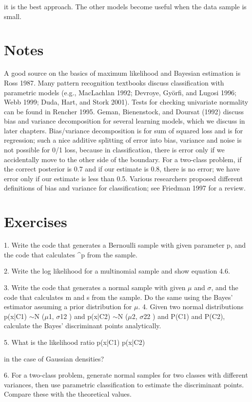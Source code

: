 it is the best approach. The other models become useful when the data sample is small.

\section{Notes}

A good source on the basics of maximum likelihood and Bayesian estimation is Ross 1987. Many pattern recognition textbooks discuss classification with parametric models (e.g., MacLachlan 1992; Devroye, Györfi, and Lugosi 1996; Webb 1999; Duda, Hart, and Stork 2001). Tests for checking univariate normality can be found in Rencher 1995. Geman, Bienenstock, and Doursat (1992) discuss bias and variance decomposition for several learning models, which we discuss in later chapters. Bias/variance decomposition is for sum of squared loss and is for regression; such a nice additive splitting of error into bias, variance and noise is not possible for 0/1 loss, because in classification, there is error only if we accidentally move to the other side of the boundary. For a two-class problem, if the correct posterior is 0.7 and if our estimate is 0.8, there is no error; we have error only if our estimate is less than 0.5. Various researchers proposed different definitions of bias and variance for classification; see Friedman 1997 for a review.

\section{Exercises}

1. Write the code that generates a Bernoulli sample with given parameter p, and the code that calculates \textasciicircum{}p from the sample.

2. Write the log likelihood for a multinomial sample and show equation 4.6.

3. Write the code that generates a normal sample with given $\mu$ and $\sigma$, and the code that calculates m and s from the sample. Do the same using the Bayes’ estimator assuming a prior distribution for $\mu$. 4. Given two normal distributions p(x|C1) $\sim$N ($\mu$1, $\sigma$12 ) and p(x|C2) $\sim$N ($\mu$2, $\sigma$22 ) and P(C1) and P(C2), calculate the Bayes’ discriminant points analytically.

5. What is the likelihood ratio p(x|C1) p(x|C2)

in the case of Gaussian densities?

6. For a two-class problem, generate normal samples for two classes with different variances, then use parametric classification to estimate the discriminant points. Compare these with the theoretical values.

